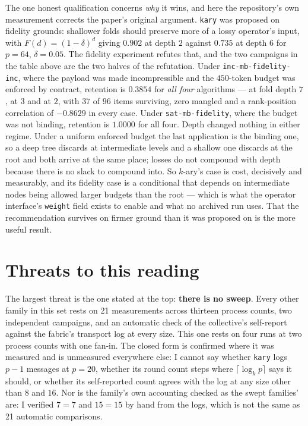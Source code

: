 \documentclass[11pt]{article}
\begin{document}
The one honest qualification concerns \emph{why} it wins, and here the repository's own
measurement corrects the paper's original argument. \texttt{kary} was proposed on fidelity
grounds: shallower folds should preserve more of a lossy operator's input, with
$F(d) = (1-\delta)^d$ giving $0.902$ at depth $2$ against $0.735$ at depth $6$ for $p=64$,
$\delta = 0.05$. The fidelity experiment refutes that, and the two campaigns in the table above
are the two halves of the refutation. Under \texttt{inc-mb-fidelity-inc}, where the payload was
made incompressible and the $450$-token budget was enforced by contract, retention is
$0.3854$ for \emph{all four} algorithms --- at fold depth $7$, at $3$ and at $2$, with $37$ of
$96$ items surviving, zero mangled and a rank-position correlation of $-0.8629$ in every case.
Under \texttt{sat-mb-fidelity}, where the budget was not binding, retention is $1.0000$ for all
four. Depth changed nothing in either regime. Under a uniform enforced budget the last application is the
binding one, so a deep tree discards at intermediate levels and a shallow one discards at the
root and both arrive at the same place; losses do not compound with depth because there is no
slack to compound into. So $k$-ary's case is cost, decisively and measurably, and its fidelity
case is a conditional that depends on intermediate nodes being allowed larger budgets than the
root --- which is what the operator interface's \texttt{weight} field exists to enable and what
no archived run uses. That the recommendation survives on firmer ground than it was proposed on
is the more useful result.

\section{Threats to this reading}

The largest threat is the one stated at the top: \textbf{there is no sweep}. Every other family
in this set rests on 21 measurements across thirteen process counts, two independent campaigns,
and an automatic check of the collective's self-report against the fabric's transport log at
every size. This one rests on four runs at two process counts with one fan-in. The closed form
is confirmed where it was measured and is unmeasured everywhere else: I cannot say whether
\texttt{kary} logs $p-1$ messages at $p=20$, whether its round count steps where
$\lceil\log_k p\rceil$ says it should, or whether its self-reported count agrees with the log at
any size other than $8$ and $16$. Nor is the family's own accounting checked as the swept
families' are: I verified $7 = 7$ and $15 = 15$ by hand from the logs, which is not the same as
21 automatic comparisons.
\end{document}
